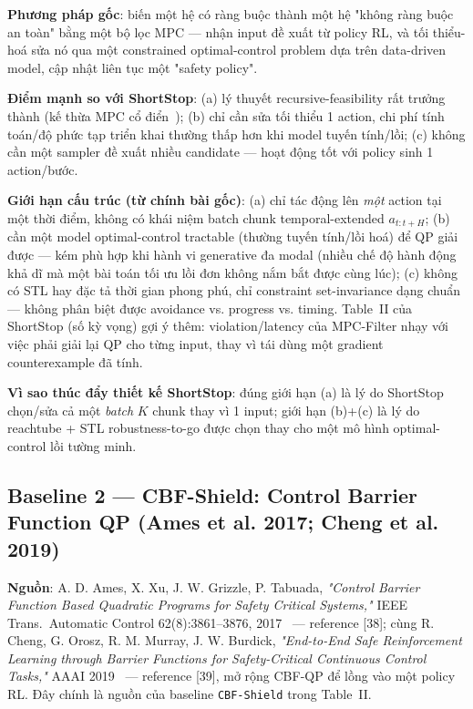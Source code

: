\documentclass[a4paper,12pt]{article}
\begin{document}
\textbf{Phương pháp gốc}: biến một hệ có ràng buộc thành một hệ "không ràng buộc an toàn" bằng một bộ lọc MPC — nhận input đề xuất từ policy RL, và tối thiểu-hoá sửa nó qua một constrained optimal-control problem dựa trên data-driven model, cập nhật liên tục một "safety policy".

\textbf{Điểm mạnh so với ShortStop}: (a) lý thuyết recursive-feasibility rất trưởng thành (kế thừa MPC cổ điển~\cite{mayne2000constrained}); (b) chỉ cần sửa tối thiểu 1 action, chi phí tính toán/độ phức tạp triển khai thường thấp hơn khi model tuyến tính/lồi; (c) không cần một sampler đề xuất nhiều candidate — hoạt động tốt với policy sinh 1 action/bước.

\textbf{Giới hạn cấu trúc (từ chính bài gốc)}: (a) chỉ tác động lên \emph{một} action tại một thời điểm, không có khái niệm batch chunk temporal-extended $a_{t:t+H}$; (b) cần một model optimal-control tractable (thường tuyến tính/lồi hoá) để QP giải được — kém phù hợp khi hành vi generative đa modal (nhiều chế độ hành động khả dĩ mà một bài toán tối ưu lồi đơn không nắm bắt được cùng lúc); (c) không có STL hay đặc tả thời gian phong phú, chỉ constraint set-invariance dạng chuẩn — không phân biệt được avoidance vs. progress vs. timing. Table~II của ShortStop (số kỳ vọng) gợi ý thêm: violation/latency của MPC-Filter nhạy với việc phải giải lại QP cho từng input, thay vì tái dùng một gradient counterexample đã tính.

\textbf{Vì sao thúc đẩy thiết kế ShortStop}: đúng giới hạn (a) là lý do ShortStop chọn/sửa cả một \emph{batch} $K$ chunk thay vì 1 input; giới hạn (b)+(c) là lý do reachtube + STL robustness-to-go được chọn thay cho một mô hình optimal-control lồi tường minh.

\subsection{Baseline 2 --- CBF-Shield: Control Barrier Function QP (Ames et al. 2017; Cheng et al. 2019)}
\textbf{Nguồn}: A. D. Ames, X. Xu, J. W. Grizzle, P. Tabuada, \emph{"Control Barrier Function Based Quadratic Programs for Safety Critical Systems,"} IEEE Trans.\ Automatic Control 62(8):3861--3876, 2017~\cite{ames2017cbf} --- reference [38]; cùng R. Cheng, G. Orosz, R. M. Murray, J. W. Burdick, \emph{"End-to-End Safe Reinforcement Learning through Barrier Functions for Safety-Critical Continuous Control Tasks,"} AAAI 2019~\cite{cheng2019end} --- reference [39], mở rộng CBF-QP để lồng vào một policy RL. Đây chính là nguồn của baseline \texttt{CBF-Shield} trong Table~II.
\end{document}
